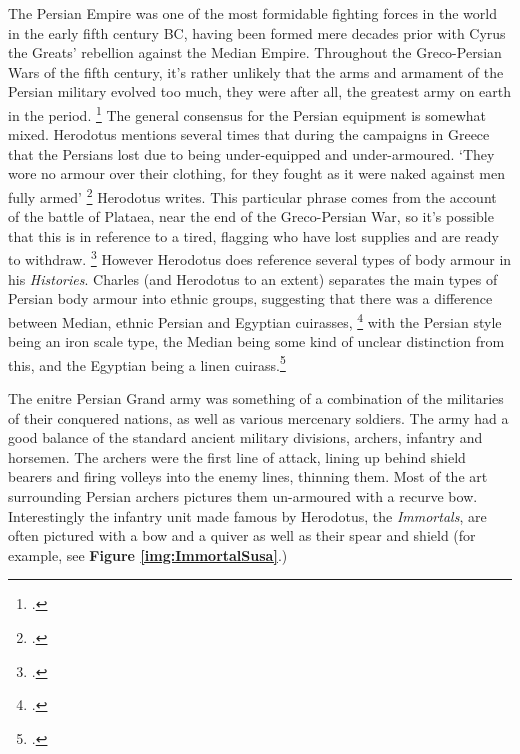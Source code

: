 \documentclass[twoside, a4paper, 12pt]{article}
\begin{document}
The Persian Empire was one of the most formidable fighting forces in the world
in the early fifth century BC, having been formed mere decades prior with
Cyrus the Greats' rebellion against the Median Empire. Throughout the
Greco-Persian Wars of the fifth century, it's rather unlikely that the arms
and armament of the Persian military evolved too much, they were after all,
the greatest army on earth in the period. \footcite{kim_grecopersia_2017}
The general consensus for the Persian equipment is somewhat mixed.
Herodotus mentions several times that during the campaigns in Greece that
the Persians lost due to being under-equipped and under-armoured.
`They wore no armour over their clothing, for they fought as it were
naked against men fully armed' \footcite[Book 9.63.2]{herodotus_1920}
Herodotus writes. This particular phrase comes from the account of the battle
of Plataea, near the end of the Greco-Persian War, so it's possible that this
is in reference to a tired, flagging who have lost supplies and are ready
to withdraw. \footcite[267]{charles_bodyarmour_2012}
However Herodotus does reference several types of body armour in his \emph{Histories}.
Charles (and Herodotus to an extent) separates the main types of Persian body armour
into ethnic groups, suggesting that there was a difference between Median,
ethnic Persian and Egyptian cuirasses,
\footcite[Book 1.135]{herodotus_1920}
with the Persian style being an iron
scale type, the Median being some kind of unclear distinction from this, and
the Egyptian being a linen cuirass.\footcite[260-2]{charles_bodyarmour_2012}

\par\vspace{1em}

The enitre Persian Grand army was something of a combination of the militaries
of their conquered nations, as well as various mercenary soldiers. The army had
a good balance of the standard ancient military divisions, archers, infantry
and horsemen. The archers were the first line of attack, lining up behind
shield bearers and firing volleys into the enemy lines, thinning them. Most
of the art surrounding Persian archers pictures them un-armoured with a recurve
bow. Interestingly the infantry unit made famous by Herodotus, the \emph{Immortals},
are often pictured with a bow and a quiver as well as their spear and shield
(for example, see \textbf{Figure \ref{img:ImmortalSusa}}.)

\par\vspace{1em}
\end{document}
